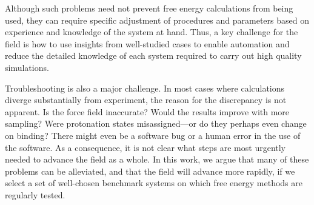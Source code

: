 \documentclass[aps,pre,twocolumn,nofootinbib,superscriptaddress,10pt, final,tightenlines]{revtex4-1}
\begin{document}
Although such problems need not prevent free energy calculations from being used, they can require specific adjustment of procedures and parameters based on experience and knowledge of the system at hand.  
Thus, a key challenge for the field is how to use insights from well-studied cases to enable automation and reduce the detailed knowledge of each system required to carry out high quality simulations. 

Troubleshooting is also a major challenge. 
In most cases where calculations diverge substantially from experiment, the reason for the discrepancy is not apparent. 
Is the force field inaccurate? 
Would the results improve with more sampling?  Were protonation states misassigned---or do they perhaps even change on binding? 
There might even be a software bug \cite{eklund_cluster_2016} or a human error in the use of the software. 
As a consequence, it is not clear what steps are most urgently needed to advance the field as a whole.
In this work, we argue that many of these problems can be alleviated, and that the field will advance more rapidly, if we select a set of well-chosen benchmark systems on which free energy methods are regularly tested.
\end{document}
